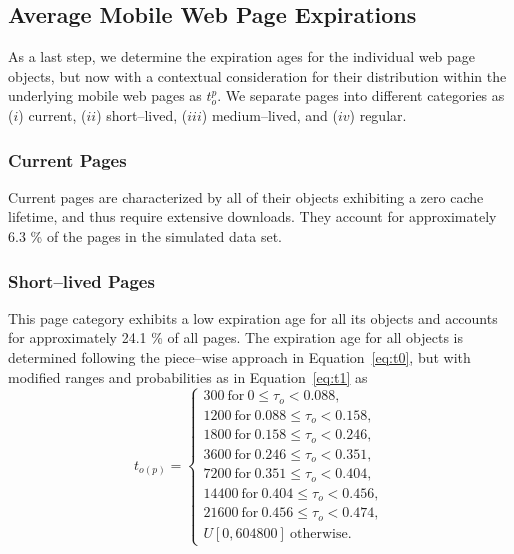 \subsection{Average Mobile Web Page Expirations}
As a last step, we determine the expiration ages for the individual web page objects, but now with a contextual consideration for their distribution within the underlying mobile web pages as $t_o^p$.
We separate pages into different categories as ($i$) current, ($ii$) short--lived, ($iii$) medium--lived, and ($iv$) regular.

\subsubsection{Current Pages}
Current pages are characterized by all of their objects exhibiting a zero cache lifetime, and thus require extensive downloads. 
They account for approximately 6.3 \% of the pages in the simulated data set.

\subsubsection{Short--lived Pages}
This page category exhibits a low expiration age for all its objects and accounts for approximately 24.1 \% of all pages.
The expiration age for all objects is determined following the piece--wise approach in Equation~\ref{eq:t0}, but with modified ranges and probabilities as in Equation~\ref{eq:t1} as 
\begin{equation}\label{eq:t1}
t_{o(p)} =
\begin{cases}
300 ~\mathrm{for}~ 0 \le \tau_o < 0.088, \\
1200 ~\mathrm{for}~ 0.088 \le \tau_o < 0.158, \\
1800 ~\mathrm{for}~0.158\le \tau_o < 0.246,\\
3600 ~\mathrm{for}~0.246 \le \tau_o < 0.351,\\
7200 ~\mathrm{for}~0.351 \le \tau_o < 0.404,\\
14400 ~\mathrm{for}~0.404 \le \tau_o < 0.456,\\
21600 ~\mathrm{for}~0.456 \le \tau_o < 0.474,\\
U[0, 604800]~\mathrm{otherwise}.
\end{cases}
\end{equation}

